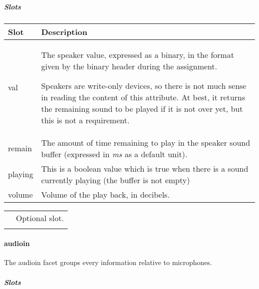 \documentclass[a4paper]{article}
\begin{document}
\subparagraph{Slots}

\begin{flushleft}
\tablehead{}
\begin{supertabular}{|m{3.293cm}|m{11.997cm}|}
\hline
\sffamily\bfseries Slot &
\sffamily\bfseries Description\\\hline
val &
{\sffamily The speaker value, expressed as a
binary, in the format given by the binary header during the
assignment.}

\sffamily Speakers are write-only devices, so
there is not much sense in reading the content of this attribute. At
best, it returns the remaining sound to be played if it is not over
yet, but this is not a requirement.\\\hline
remain &
\textsf{The amount of time remaining to play in
the speaker sound buffer (expressed in }\textsf{\textit{ms}}\textsf{ as
a default unit).}\\\hline
playing &
\sffamily This is a boolean value which is true
when there is a sound currently playing (the buffer is not
empty)\\\hline
volume &
\sffamily Volume of the play back, in
decibels.\\\hline
\end{supertabular}
\end{flushleft}
\begin{flushleft}
\tablehead{}
\begin{supertabular}{|m{1.717cm}|m{10.464cm}}
\hhline{-~}
 &
Optional slot.\\\hhline{-~}
\end{supertabular}
\end{flushleft}
\paragraph{audioin}

{\sffamily
The audioin facet groups every information relative to microphones. }

\subparagraph{Slots}
\end{document}
